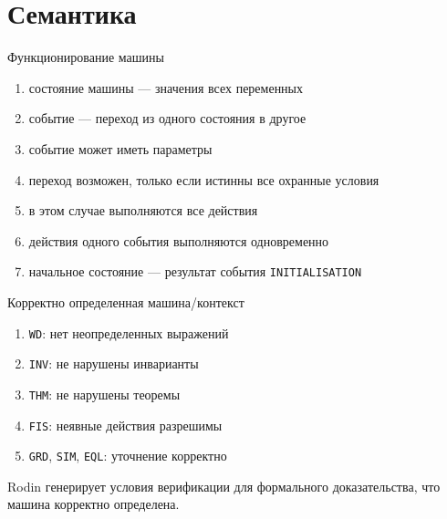 \documentclass[hyperref={unicode=true}]{beamer}
\begin{document}
	\section{Семантика}

	\begin{frame}{Функционирование машины}
		\begin{enumerate}
			\item состояние машины --- значения всех переменных
			\item событие --- переход из одного состояния в другое
			\item событие может иметь параметры
			\item переход возможен, только если истинны
			      все охранные условия
			\item в этом случае выполняются все действия
			\item действия одного события выполняются одновременно
			\item начальное состояние --- результат события \texttt{INITIALISATION}
		\end{enumerate}
	\end{frame}

	\begin{frame}{Корректно определенная машина/контекст}
		\begin{enumerate}
			\item \texttt{WD}: нет неопределенных выражений
			\item \texttt{INV}: не нарушены инварианты
			\item \texttt{THM}: не нарушены теоремы
			\item \texttt{FIS}: неявные действия разрешимы
			\item \texttt{GRD}, \texttt{SIM}, \texttt{EQL}:
			      уточнение корректно
		\end{enumerate}

		Rodin генерирует условия верификации для формального
		доказательства, что машина корректно определена.
	\end{frame}
\end{document}
